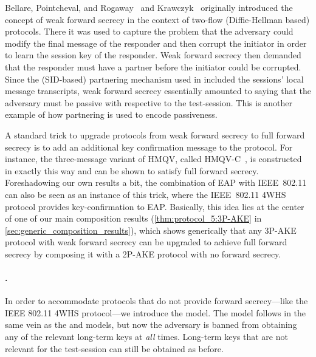 Bellare, Pointcheval, and Rogaway~\cite{EC:BelPoiRog00} and Krawczyk~\cite{C:Krawczyk05}
originally introduced the concept of weak forward secrecy in the context of two-flow (Diffie-Hellman based) protocols.
There it was used to capture the problem that the adversary could modify the final message of the responder
and then corrupt the initiator in order to learn the session key of the responder.
Weak forward secrecy then demanded that the responder must have a partner before the initiator could be corrupted.
Since the (SID-based) partnering mechanism used in \cite{EC:BelPoiRog00,C:Krawczyk05} included the sessions' local message transcripts,
weak forward secrecy essentially amounted to saying that the adversary must be passive with respective to the test-session.
This is another example of how partnering is used to encode passiveness.



A standard trick to upgrade protocols from weak forward secrecy to full forward secrecy is to add an additional key confirmation message to the protocol.
For instance,
the three-message variant of HMQV,
called HMQV-C~\cite{EPRINT:Krawczyk05},
is constructed in exactly this way and can be shown to satisfy full forward secrecy.
Foreshadowing our own results a bit,
the combination of  EAP with IEEE~802.11 can also be seen as an instance of this trick,
where the IEEE~802.11 4WHS protocol provides key-confirmation to EAP. 
Basically,
this idea lies at the center of one of our main composition results (\cref{thm:protocol_5:3P-AKE} in \cref{sec:generic_composition_results}),
which shows generically that any 3P-AKE protocol with weak forward secrecy
can be upgraded to achieve full forward secrecy by composing it with a 2P-AKE protocol with no forward secrecy.

\paragraph{\texorpdfstring{\akenfstext}{AKEnfs}.}
In order to accommodate protocols that do not provide forward secrecy---like the IEEE 802.11 4WHS protocol---we introduce the \akenfstext model.
The \akenfstext model follows in the same vein as the \akefstext and \akewfstext models,
but now the adversary is banned from obtaining any of the relevant long-term keys at \emph{all} times. 
Long-term keys that are not relevant for the test-session can still be obtained as before.


 


